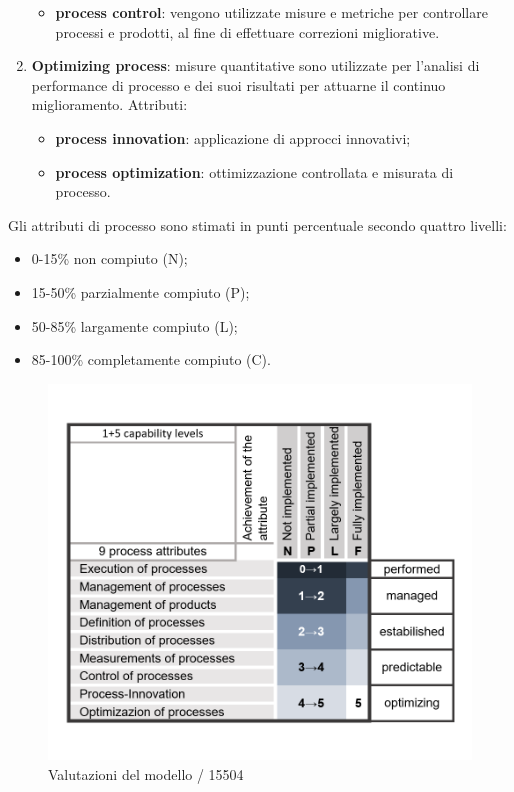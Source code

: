 \begin{enumerate}
\begin{itemize}
			\item \textbf{process control}: vengono utilizzate misure e metriche per controllare processi e prodotti, al fine di effettuare correzioni migliorative.
		\end{itemize}
	\item \textbf{Optimizing process}: misure quantitative sono utilizzate per l'analisi di performance di processo e dei suoi risultati per attuarne il continuo miglioramento. Attributi:
		\begin{itemize}
			\item \textbf{process innovation}: applicazione di approcci innovativi;
			\item \textbf{process optimization}: ottimizzazione controllata e misurata di processo.
		\end{itemize}
\end{enumerate}
Gli attributi di processo sono stimati in punti percentuale secondo quattro livelli: 
\begin{itemize}
	\item 0-15\% non compiuto (N);
	\item 15-50\% parzialmente compiuto (P);
	\item 50-85\% largamente compiuto (L);
	\item 85-100\% completamente compiuto (C).
\end{itemize}
\begin{figure}[H]
	\centering
	\includegraphics[width=13cm]{spice.png}
	\caption{Valutazioni del modello / 15504}
\end{figure}
